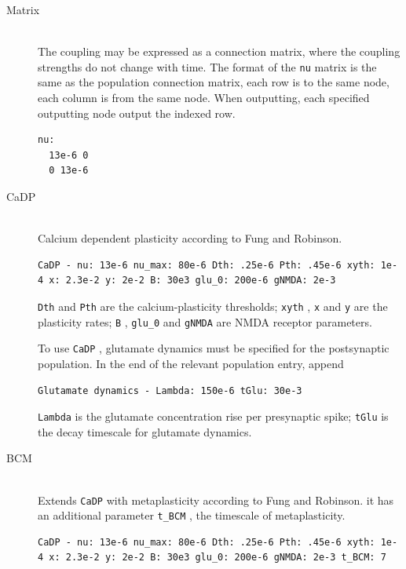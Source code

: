 \documentclass[12pt,a4paper]{article}
\newcommand{\type}[1]{{\small\small\tt #1} }
\begin{document}
\begin{itemize}
\begin{description}
    \item[Matrix]\ \\

    The coupling may be expressed as a connection matrix, where the coupling
    strengths do not change with time. The format of the \texttt{nu} matrix is
    the same as the population connection matrix, each row is to the same
    node, each column is from the same node. When outputting, each specified
    outputting node output the indexed row.

    \begin{lstlisting}
nu:
  13e-6 0
  0 13e-6
    \end{lstlisting}

    \item[CaDP]\ \\
    Calcium dependent plasticity according to Fung and Robinson.
    \begin{lstlisting}
CaDP - nu: 13e-6 nu_max: 80e-6 Dth: .25e-6 Pth: .45e-6 xyth: 1e-4 x: 2.3e-2 y: 2e-2 B: 30e3 glu_0: 200e-6 gNMDA: 2e-3
    \end{lstlisting}

    \type{Dth} and \type{Pth} are the calcium-plasticity thresholds; \type{xyth}, \type{x} and \type{y} are the plasticity rates; \type{B}, \type{glu\_0} and \type{gNMDA} are NMDA receptor parameters.

    To use \type{CaDP}, glutamate dynamics must be specified for the postsynaptic population. In the end of the relevant population entry, append
    \begin{lstlisting}
Glutamate dynamics - Lambda: 150e-6 tGlu: 30e-3
    \end{lstlisting}
    \type{Lambda} is the glutamate concentration rise per presynaptic spike; \type{tGlu} is the decay timescale for glutamate dynamics.

    \item[BCM]\ \\
    Extends \type{CaDP} with metaplasticity according to Fung and Robinson. it has an additional parameter \type{t\_BCM}, the timescale of metaplasticity.
    \begin{lstlisting}
CaDP - nu: 13e-6 nu_max: 80e-6 Dth: .25e-6 Pth: .45e-6 xyth: 1e-4 x: 2.3e-2 y: 2e-2 B: 30e3 glu_0: 200e-6 gNMDA: 2e-3 t_BCM: 7
    \end{lstlisting}


\end{description}
\end{itemize}
\end{document}

